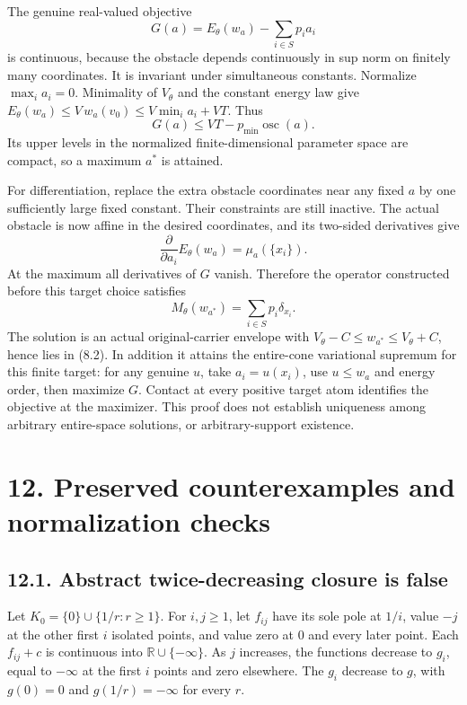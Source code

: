 \documentclass[
  10pt,
]{article}
\begin{document}
The genuine real-valued objective
\[G(a)=E_\theta(w_a)-\sum_{i\in S}p_i a_i\] is continuous, because the
obstacle depends continuously in sup norm on finitely many coordinates.
It is invariant under simultaneous constants. Normalize
\(\max_i a_i=0\). Minimality of \(V_\theta\) and the constant energy law
give \(E_\theta(w_a)\leq V\,w_a(v_0)\leq V\min_i a_i+VT\). Thus
\[G(a)\leq VT-p_{\min}\operatorname{osc}(a).\tag{11.2}\] Its upper
levels in the normalized finite-dimensional parameter space are compact,
so a maximum \(a^*\) is attained.

For differentiation, replace the extra obstacle coordinates near any
fixed \(a\) by one sufficiently large fixed constant. Their constraints
are still inactive. The actual obstacle is now affine in the desired
coordinates, and its two-sided derivatives give
\[\frac{\partial}{\partial a_i}E_\theta(w_a)=\mu_a(\{x_i\}).\] At the
maximum all derivatives of \(G\) vanish. Therefore the operator
constructed before this target choice satisfies
\[M_\theta(w_{a^*})=\sum_{i\in S}p_i\delta_{x_i}.\tag{11.3}\] The
solution is an actual original-carrier envelope with
\(V_\theta-C\leq w_{a^*}\leq V_\theta+C\), hence lies in (8.2). In
addition it attains the entire-cone variational supremum for this finite
target: for any genuine \(u\), take \(a_i=u(x_i)\), use \(u\leq w_a\)
and energy order, then maximize \(G\). Contact at every positive target
atom identifies the objective at the maximizer. This proof does not
establish uniqueness among arbitrary entire-space solutions, or
arbitrary-support existence.

\section{12. Preserved counterexamples and normalization
checks}\label{preserved-counterexamples-and-normalization-checks}

\subsection{12.1. Abstract twice-decreasing closure is
false}\label{abstract-twice-decreasing-closure-is-false}

Let \(K_0=\{0\}\cup\{1/r:r\geq1\}\). For \(i,j\geq1\), let \(f_{ij}\)
have its sole pole at \(1/i\), value \(-j\) at the other first \(i\)
isolated points, and value zero at \(0\) and every later point. Each
\(f_{ij}+c\) is continuous into \(\mathbb R\cup\{-\infty\}\). As \(j\)
increases, the functions decrease to \(g_i\), equal to \(-\infty\) at
the first \(i\) points and zero elsewhere. The \(g_i\) decrease to
\(g\), with \(g(0)=0\) and \(g(1/r)=-\infty\) for every \(r\).
\end{document}
